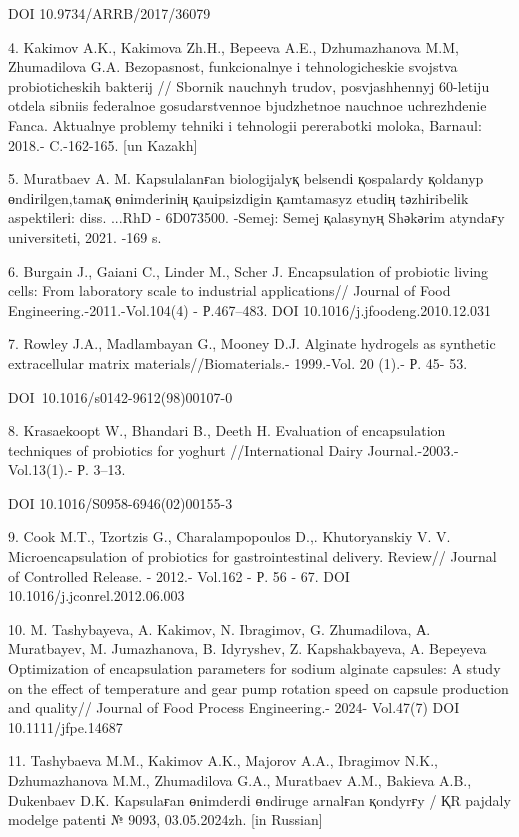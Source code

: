 DOI 10.9734/ARRB/2017/36079

4. Kakimov A.K., Kakimova Zh.H., Bepeeva A.E., Dzhumazhanova M.M,
Zhumadilova G.A. Bezopasnost\textquotesingle,
funkcional\textquotesingle nye i tehnologicheskie svojstva
probioticheskih bakterij // Sbornik nauchnyh trudov, posvjashhennyj
60-letiju otdela sibniis federal\textquotesingle noe gosudarstvennoe
bjudzhetnoe nauchnoe uchrezhdenie Fanca. Aktual\textquotesingle nye
problemy tehniki i tehnologii pererabotki moloka, Barnaul: 2018.-
C.-162-165. {[}un Kazakh{]}

5. Muratbaev A. M. Kapsulalanғan biologijalyқ belsendі қospalardy
қoldanyp өndіrіlgen,tamaқ өnіmderіnің қauіpsіzdіgіn қamtamasyz etudің
tәzhіribelіk aspektіlerі: diss. ...RhD - 6D073500. -Semej: Semej
қalasynyң Shәkәrіm atyndaғy universitetі, 2021. -169 s.

6. Burgain J., Gaiani C., Linder M., Scher J. Encapsulation of probiotic
living cells: From laboratory scale to industrial applications// Journal
of Food Engineering.-2011.-Vol.104(4) - Р.467--483. DOI
10.1016/j.jfoodeng.2010.12.031

7. Rowley J.A., Madlambayan G., Mooney D.J. Alginate hydrogels as
synthetic extracellular matrix materials//Biomaterials.- 1999.-Vol. 20
(1).- Р. 45- 53.

DOI~10.1016/s0142-9612(98)00107-0

8. Krasaekoopt W., Bhandari B., Deeth H. Evaluation of encapsulation
techniques of probiotics for yoghurt //International Dairy
Journal.-2003.- Vol.13(1).- Р. 3--13.

DOI 10.1016/S0958-6946(02)00155-3

9. Cook M.T., Tzortzis G., Charalampopoulos D.,. Khutoryanskiy V. V.
Microencapsulation of probiotics for gastrointestinal delivery. Review//
Journal of Controlled Release. - 2012.- Vol.162 - Р. 56 - 67. DOI
10.1016/j.jconrel.2012.06.003

10. M. Tashybayeva, A. Kakimov, N. Ibragimov, G. Zhumadilova, А.
Muratbayev, M. Jumazhanova, B. Idyryshev, Z. Kapshakbayeva, A. Bepeyeva
Optimization of encapsulation parameters for sodium alginate capsules: A
study on the effect of temperature and gear pump rotation speed on
capsule production and quality// Journal of Food Process Engineering.-
2024- Vol.47(7) DOI 10.1111/jfpe.14687

11. Tashybaeva M.M., Kakimov A.K., Majorov A.A., Ibragimov N.K.,
Dzhumazhanova M.M., Zhumadilova G.A., Muratbaev A.M., Bakieva A.B.,
Dukenbaev D.K. Kapsulaғan өnіmderdі өndіruge arnalғan қondyrғy / ҚR
pajdaly model\textquotesingle ge patentі № 9093, 03.05.2024zh. {[}in
Russian{]}


